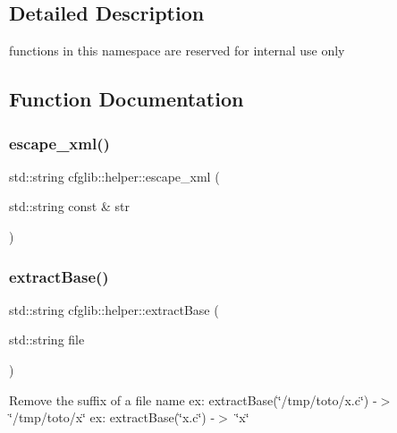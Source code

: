 \subsection{Detailed Description}
functions in this namespace are reserved for internal use only 

\subsection{Function Documentation}
\mbox{\label{namespacecfglib_1_1helper_aba2387b203342db23a47897b59779631}} 
\subsubsection{\texorpdfstring{escape\+\_\+xml()}{escape\_xml()}}
{\footnotesize\ttfamily std\+::string cfglib\+::helper\+::escape\+\_\+xml (\begin{DoxyParamCaption}\item[{std\+::string const \&}]{str }\end{DoxyParamCaption})\hspace{0.3cm}{\ttfamily [inline]}}

\mbox{\label{namespacecfglib_1_1helper_a6fa2db3729eb85015591dea07b7f0b69}} 
\subsubsection{\texorpdfstring{extract\+Base()}{extractBase()}}
{\footnotesize\ttfamily std\+::string cfglib\+::helper\+::extract\+Base (\begin{DoxyParamCaption}\item[{std\+::string}]{file }\end{DoxyParamCaption})\hspace{0.3cm}{\ttfamily [inline]}}

Remove the suffix of a file name ex\+: extract\+Base(\char`\"{}/tmp/toto/x.\+c\char`\"{}) -\/$>$ \char`\"{}/tmp/toto/x\char`\"{} ex\+: extract\+Base(\char`\"{}x.\+c\char`\"{}) -\/$>$ \char`\"{}x\char`\"{} \mbox{\label{namespacecfglib_1_1helper_aabf0f4f63ae88972fdf9f6f3d4bf76e4}} 
